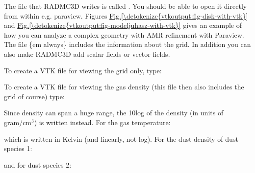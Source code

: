 \documentclass[letterpaper,10pt,english]{sphinxmanual}
\begin{document}
The file that RADMC\sphinxhyphen{}3D writes is called . You should be able to
open it directly from within e.g. paraview. Figures \hyperref[\detokenize{vtkoutput:fig-disk-with-vtk}]{Fig.\@ \ref{\detokenize{vtkoutput:fig-disk-with-vtk}}}
and \hyperref[\detokenize{vtkoutput:fig-modeljuhasz-with-vtk}]{Fig.\@ \ref{\detokenize{vtkoutput:fig-modeljuhasz-with-vtk}}} gives an example of how you can analyze a
complex geometry with AMR refinement with Paraview. The file \{em always\}
includes the information about the grid. In addition you can also make RADMC\sphinxhyphen{}3D
add scalar fields or vector fields.

To create a VTK file for viewing the grid only, type:

\begin{sphinxVerbatim}[commandchars=\\\{\}]
 
\end{sphinxVerbatim}

To create a VTK file for viewing the gas density (this file then also
includes the grid of course) type:

\begin{sphinxVerbatim}[commandchars=\\\{\}]
 
\end{sphinxVerbatim}

Since density can span a huge range, the 10\sphinxhyphen{}log of the density (in units of
gram/cm\(^3\)) is written instead. For the gas temperature:

\begin{sphinxVerbatim}[commandchars=\\\{\}]
 
\end{sphinxVerbatim}

which is written in Kelvin (and linearly, not log). For the dust density of
dust species 1:

\begin{sphinxVerbatim}[commandchars=\\\{\}]
  
\end{sphinxVerbatim}

and for dust species 2:

\begin{sphinxVerbatim}[commandchars=\\\{\}]
  
\end{sphinxVerbatim}
\end{document}
